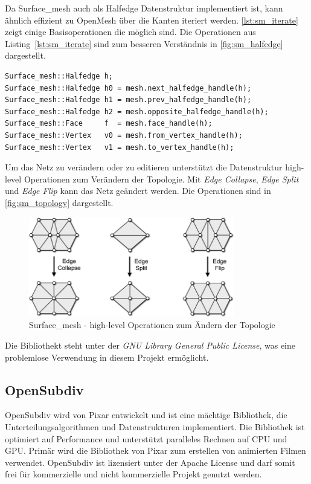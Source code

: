 Da Surface\_mesh auch als Halfedge Datenstruktur implementiert ist, kann ähnlich effizient zu OpenMesh über die Kanten iteriert werden.
\autoref{lst:sm_iterate} zeigt einige Basisoperationen die möglich sind.
Die Operationen aus Listing~\ref{lst:sm_iterate} sind zum besseren Verständnis in \autoref{fig:sm_halfedge} dargestellt. 

\begin{lstlisting}[style=myCppStyle, caption=Surface\_mesh - Basisoperationen, label=lst:sm_iterate]
Surface_mesh::Halfedge h;
Surface_mesh::Halfedge h0 = mesh.next_halfedge_handle(h);
Surface_mesh::Halfedge h1 = mesh.prev_halfedge_handle(h);
Surface_mesh::Halfedge h2 = mesh.opposite_halfedge_handle(h);
Surface_mesh::Face     f  = mesh.face_handle(h);
Surface_mesh::Vertex   v0 = mesh.from_vertex_handle(h);
Surface_mesh::Vertex   v1 = mesh.to_vertex_handle(h);
\end{lstlisting}

Um das Netz zu verändern oder zu editieren unterstützt die Datenstruktur high-level Operationen zum Verändern der Topologie.
Mit \emph{Edge Collapse}, \emph{Edge Split} und \emph{Edge Flip} kann das Netz geändert werden.
Die Operationen sind in \autoref{fig:sm_topology} dargestellt. 

\begin{figure}
    \centering
  \includegraphics[width=0.8\textwidth]{content/media/sm_topology-changes}
  \caption{Surface\_mesh - high-level Operationen zum Ändern der Topologie \cite{OpenGP.24.07.2015}}
  \label{fig:sm_topology}
\end{figure}

Die Bibliothekt steht unter der \emph{GNU Library General Public License}, was eine problemlose Verwendung in diesem Projekt ermöglicht.

\subsection{OpenSubdiv}

OpenSubdiv wird von Pixar entwickelt und ist eine mächtige Bibliothek, die Unterteilungsalgorithmen und Datenstrukturen implementiert.
Die Bibliothek ist optimiert auf Performance und unterstützt paralleles Rechnen auf CPU und GPU.
Primär wird die Bibliothek von Pixar zum erstellen von animierten Filmen verwendet.
OpenSubdiv ist lizensiert unter der Apache License und darf somit frei für kommerzielle und nicht kommerzielle Projekt genutzt werden.

